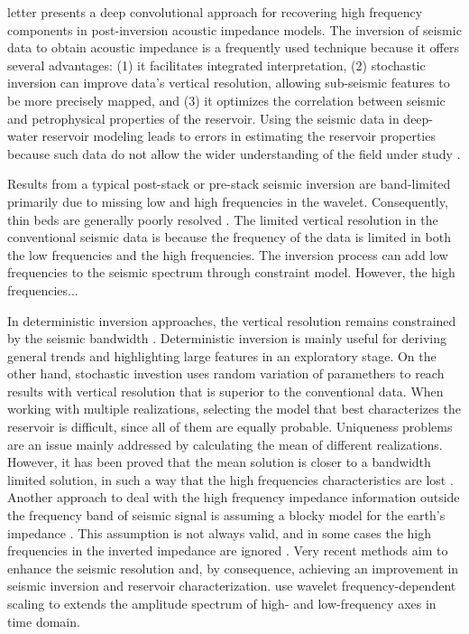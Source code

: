 \documentclass[journal]{IEEEtran}
\begin{document}
 letter presents a deep convolutional approach
for recovering high frequency components in post-inversion acoustic
impedance models. The inversion of seismic data to obtain acoustic impedance
is a frequently used technique because it offers several advantages: (1) it
facilitates integrated interpretation, (2) stochastic inversion can improve
data's vertical resolution, allowing sub-seismic features to be more precisely
mapped, and (3) it optimizes the correlation between seismic and petrophysical
properties of the reservoir. Using the seismic data in deep-water reservoir modeling leads to errors in estimating
the reservoir properties because such data do not allow the wider understanding of the field
under study \cite{Sergio2016}. 

Results from a typical post-stack or pre-stack seismic inversion are band-limited
primarily due to missing low and high frequencies in the wavelet. Consequently, thin beds
are generally poorly resolved \cite{Zhang2012}.
The limited vertical resolution in the conventional seismic data is because 
the frequency of the data is limited in both the low frequencies and the
high frequencies. The inversion process can add low frequencies to the
seismic spectrum through constraint model. However, the high frequencies...

In deterministic inversion approaches, the vertical resolution remains constrained
by the seismic bandwidth \cite{Sancevero2005}. Deterministic inversion is mainly useful for deriving
general trends and highlighting large features in an exploratory stage.
On the other hand, stochastic investion uses random variation of paramethers to
reach results with vertical resolution that is superior to the conventional data.
When working with multiple realizations, selecting the model that best characterizes
the reservoir is difficult, since all of them are equally probable.
Uniqueness problems are an issue mainly addressed by calculating the mean of different realizations.
However, it has been proved that the mean solution is closer to a bandwidth limited solution,
in such a way that the high frequencies characteristics are lost \cite{Cook2010}.
Another approach to deal with the high frequency impedance information outside the frequency band of seismic signal
is assuming a blocky model for the earth's impedance \cite{Cook2010}. This assumption is not always valid,
and in some cases the high frequencies in the inverted impedance are ignored \cite{YuanWang2015}.
Very recent methods aim to enhance the seismic resolution and, by consequence, achieving an improvement in
seismic inversion and reservoir characterization.
\cite{ChenWang2018} use wavelet frequency-dependent scaling to extends the amplitude spectrum of
high- and low-frequency axes in time domain.
\end{document}
